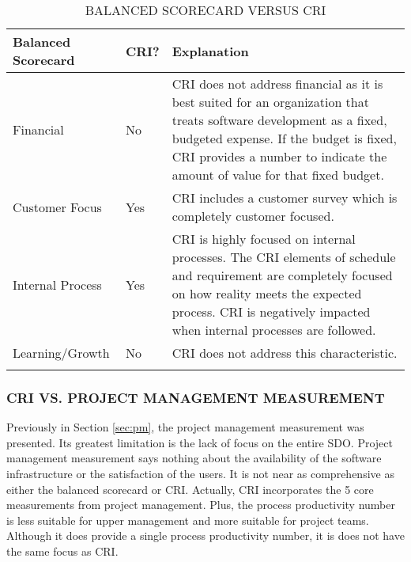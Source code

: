 \documentclass[SDSUThesis.tex]{subfiles}
\begin{document}
             \begin{longtable}{p{3cm}p{1cm}p{10cm}}
                
                \toprule%
                 \centering%
                 {\bfseries Balanced Scorecard}
                 & {\bfseries CRI?} 
                 & {\bfseries Explanation} \\
                
                \cmidrule[0.4pt](r{0.125em}){1-1}%
                \cmidrule[0.4pt](lr{0.125em}){2-2}%
                \cmidrule[0.4pt](lr{0.125em}){3-3}%
                \endhead
                
                Financial & No & CRI does not address financial as it is best suited 
                    for an organization that treats software development as a fixed,
                    budgeted expense. If the budget is fixed, CRI provides a number
                    to indicate the amount of value for that fixed budget.  \\
                \myrowcolour%
                Customer Focus & Yes & CRI includes a customer survey which is 
                    completely customer focused.\\
                Internal Process & Yes & CRI is highly focused on internal processes.
                    The CRI elements of schedule and requirement are completely
                    focused on how reality meets the expected process. CRI is
                    negatively impacted when internal processes are followed. \\
                \myrowcolour%
                Learning/Growth & No & CRI does not address this characteristic. \\
                
                \bottomrule
                
                \caption{BALANCED SCORECARD VERSUS CRI}
                \label{tab:bsc}
            \end{longtable}

        
        \subsubsection{CRI VS. PROJECT MANAGEMENT MEASUREMENT}
            Previously in Section \ref{sec:pm}, the project management
            measurement was presented.   Its greatest limitation is the lack of
            focus on the entire SDO.  Project management measurement says 
            nothing about the availability of the software infrastructure
            or the satisfaction of the users.  It is not near as comprehensive
            as either the balanced scorecard or CRI. Actually, CRI incorporates
            the 5 core measurements from project management.
            Plus, the process productivity
            number is less suitable for upper management and more
            suitable for project teams.  Although it does provide a single
            process productivity number, it is does not have the same focus
            as CRI.
            
            
            
            
\end{document}
